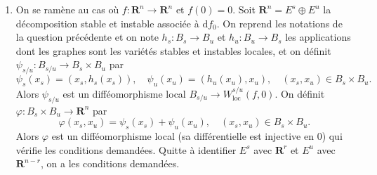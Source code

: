 \documentclass[a4paper,12pt,openany]{article}
\theoremstyle{plain}
\theoremstyle{definition}
\newcommand{\dd}{\mathrm{d}}
\newcommand{\R}{\mathbf{R}}
\begin{document}
\begin{enumerate}
En diff\'erenciant, il vient
\begin{equation}\label{eq:fixpoint}
(\dd g)_0 (x_s) = (\dd \chi)_{(0,0)} \bigl(x_s,~(\dd g)_0(x_s)\bigr).
\end{equation}
En diff\'erenciant $\chi$ au point $(0,0) \in B_s \times \mathcal{S}_0(B)$, on voit aussi que $\dd \chi_{(0,0)} = \tilde \chi,$ o\`u $\tilde \chi$ est d\'efinie comme $\chi$ en rempla\c ant $\eta$ par $(\dd \eta)_0$ dans l'\'equation (\ref{eq:defchi}). 

Par unicit\'e de l'\'equation (\ref{eq:fixpoint0}) (en rempla\c ant $\chi$ par $\tilde \chi$), et par (\ref{eq:fixpoint}), on obtient que la vari\'et\'e stable de $A + (\dd \eta)_0$ est donn\'ee par le graphe de $x_s \mapsto \pi_u[(\dd g)_0(x_s)(0)]$ (car $\dd(\pi_u \circ g) = \pi_u \circ \dd g$ puisque $\pi_u$ est lin\'eaire), c'est \`a dire par le graphe de $x_s \mapsto (\dd h)_0(x_s)$ qui est par d\'efinition l'espace tangent de la vari\'et\'e stable locale de $A + \eta$ en $0$. 

Or, la vari\'et\'e stable de l'application lin\'eaire $A + (\dd \eta)_0$ est l'espace stable de $A + (\dd \eta)_0$ ; cela conclut puisque, avec les identifications faites au d\'ebut de la question, on a $A + (\dd \eta)_0 = (\dd f)_0$. 

\item On se ram\`ene au cas o\`u $f : \R^n \to \R^n$ et $f(0) = 0$. Soit $\R^n = E^s \oplus E^u$ la d\'ecomposition stable et instable associ\'ee \`a $ \dd f_0$. On reprend les notations de la question pr\'ec\'edente et on note $h_s : B_s \to B_u$ et $h_u : B_u \to B_s$ les applications dont les graphes sont les vari\'et\'es stables et instables locales, et on d\'efinit $\psi_{s/u} : B_{s/u} \to B_s \times B_u$ par
$$
\psi_s(x_s) = (x_s, h_s(x_s)), \quad \psi_u(x_u) = (h_u(x_u), x_u), \quad (x_s, x_u) \in B_s \times B_u.
$$
Alors $\psi_{s/u}$ est un diff\'eomorphisme local $B_{s/u} \to W^{s/u}_\mathrm{loc}(f,0).$
On d\'efinit $\varphi : B_s \times B_u \to \R^n$ par
$$
\varphi(x_s, x_u) = \psi_s(x_s) + \psi_u(x_u), \quad (x_s, x_u) \in B_s \times B_u.
$$
Alors $\varphi$ est un diff\'eomorphisme local (sa diff\'erentielle est injective en $0$) qui v\'erifie les conditions demand\'ees. Quitte \`a identifier $E^s$ avec $\R^r$ et $E^u$ avec $\R^{n-r}$, on a les conditions demand\'ees.


\end{enumerate}
\end{document}
